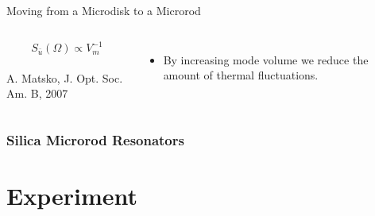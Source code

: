 \documentclass{beamer}
\begin{document}
\begin{frame}
\begin{block}{Moving from a Microdisk to a Microrod}
\begin{columns}
$$S_{\bar{u}}(\Omega)\propto V_m^{-1}$$\\

\footnotesize{A. Matsko, J. Opt. Soc. Am. B, 2007}\\

\begin{itemize}
\item By increasing mode volume we reduce the amount of thermal fluctuations.
\end{itemize}

\end{columns}
\end{block}
\end{frame}

\begin{frame}\frametitle{Silica Microrod Resonators}
\end{frame}

\section{Experiment}
\end{document}
